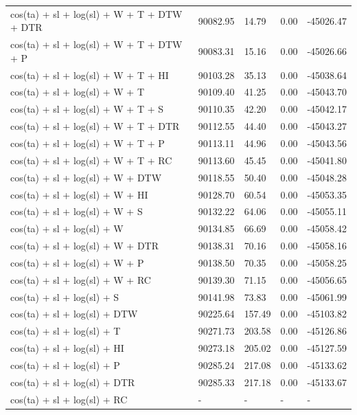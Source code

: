 \documentclass[abstract=off,10pt,a4paper,bibliography=totocnumbered]{article}
\begin{document}
\begin{table}[hbpt]
\begin{center}
{\begin{threeparttable}
\begin{tabular}{lllll}
          cos(ta) + sl + log(sl) + W + T + DTW + DTR & 90082.95 & 14.79 & 0.00 & -45026.47 \\
          cos(ta) + sl + log(sl) + W + T + DTW + P & 90083.31 & 15.16 & 0.00 & -45026.66 \\
          cos(ta) + sl + log(sl) + W + T + HI & 90103.28 & 35.13 & 0.00 & -45038.64 \\
          cos(ta) + sl + log(sl) + W + T & 90109.40 & 41.25 & 0.00 & -45043.70 \\
          cos(ta) + sl + log(sl) + W + T + S & 90110.35 & 42.20 & 0.00 & -45042.17 \\
          cos(ta) + sl + log(sl) + W + T + DTR & 90112.55 & 44.40 & 0.00 & -45043.27 \\
          cos(ta) + sl + log(sl) + W + T + P & 90113.11 & 44.96 & 0.00 & -45043.56 \\
          cos(ta) + sl + log(sl) + W + T + RC & 90113.60 & 45.45 & 0.00 & -45041.80 \\
          cos(ta) + sl + log(sl) + W + DTW & 90118.55 & 50.40 & 0.00 & -45048.28 \\
          cos(ta) + sl + log(sl) + W + HI & 90128.70 & 60.54 & 0.00 & -45053.35 \\
          cos(ta) + sl + log(sl) + W + S & 90132.22 & 64.06 & 0.00 & -45055.11 \\
          cos(ta) + sl + log(sl) + W & 90134.85 & 66.69 & 0.00 & -45058.42 \\
          cos(ta) + sl + log(sl) + W + DTR & 90138.31 & 70.16 & 0.00 & -45058.16 \\
          cos(ta) + sl + log(sl) + W + P & 90138.50 & 70.35 & 0.00 & -45058.25 \\
          cos(ta) + sl + log(sl) + W + RC & 90139.30 & 71.15 & 0.00 & -45056.65 \\
          cos(ta) + sl + log(sl) + S & 90141.98 & 73.83 & 0.00 & -45061.99 \\
          cos(ta) + sl + log(sl) + DTW & 90225.64 & 157.49 & 0.00 & -45103.82 \\
          cos(ta) + sl + log(sl) + T & 90271.73 & 203.58 & 0.00 & -45126.86 \\
          cos(ta) + sl + log(sl) + HI & 90273.18 & 205.02 & 0.00 & -45127.59 \\
          cos(ta) + sl + log(sl) + P & 90285.24 & 217.08 & 0.00 & -45133.62 \\
          cos(ta) + sl + log(sl) + DTR & 90285.33 & 217.18 & 0.00 & -45133.67 \\
          cos(ta) + sl + log(sl) + RC & - & - & - & - \\

\end{tabular}
\end{threeparttable}}
\end{center}
\end{table}
\end{document}
